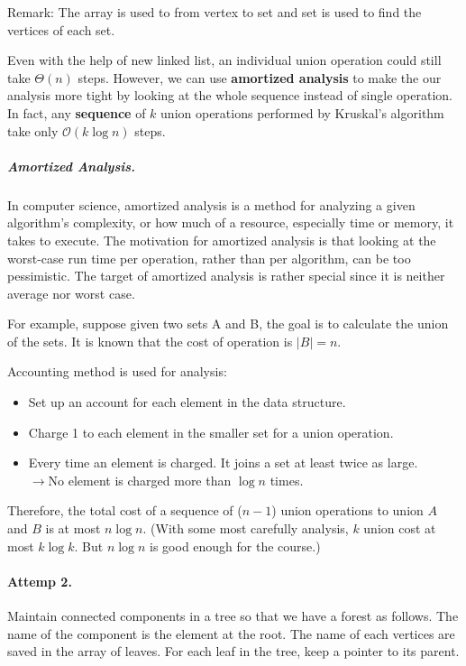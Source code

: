 Remark: The array is used to from vertex to set and set is used to find the vertices of each set.

Even with the help of new linked list, an individual union operation could still take $\Theta(n)$ steps. However, we can use \textbf{amortized analysis} to make the our analysis more tight by looking at the whole sequence instead of single operation. In fact, any \textbf{sequence} of $k$ union operations performed by Kruskal's algorithm take only $\mathcal{O}(k\log n)$ steps.

\subparagraph{Amortized Analysis.} In computer science, amortized analysis is a method for analyzing a given algorithm's complexity, or how much of a resource, especially time or memory, it takes to execute. The motivation for amortized analysis is that looking at the worst-case run time per operation, rather than per algorithm, can be too pessimistic. The target of amortized analysis is rather special since it is neither average nor worst case.

For example, suppose given two sets A and B, the goal is to calculate the union of the sets. It is known that the cost of operation is $|B| = n$.
 
Accounting method is used for analysis:
\begin{itemize}
	\item Set up an account for each element in the data structure. 
	\item Charge 1 to each element in the smaller set for a union operation. 
	\item Every time an element is charged. It joins a set at least twice as large. \\ $\rightarrow$No element is charged more than $\log n$ times.
\end{itemize}

Therefore, the total cost of a sequence of ($n-1$) union operations to union $A$ and $B$ is at most $n \log n$. (With some most carefully analysis, $k$ union cost at most $k\log k$. But $n\log n $ is good enough for the course.)

\paragraph{Attemp 2.} Maintain connected components in a tree so that we have a forest as follows. The name of the component is the element at the root. The name of each vertices are saved in the array of leaves. For each leaf in the tree, keep a pointer to its parent. 

